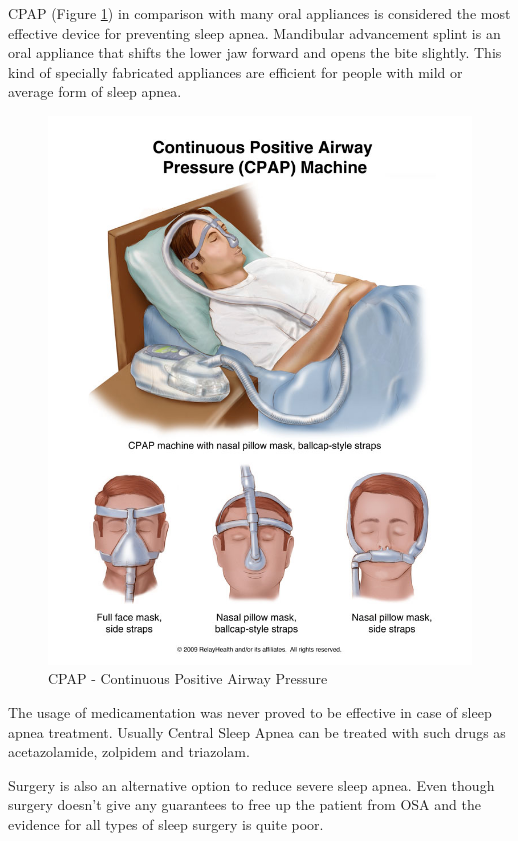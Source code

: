 \documentclass[12pt,a4paper]{report}
\begin{document}
CPAP (Figure \ref{fig:cpap}) in comparison with many oral appliances is considered the most effective device for preventing sleep apnea. Mandibular advancement splint is an oral appliance that shifts the lower jaw forward and opens the bite slightly. This kind of specially fabricated appliances are efficient for people with mild or average form of sleep apnea.

\begin{figure}[h]
\centering
  \includegraphics[max height=\textheight, max width=\textwidth, keepaspectratio]{06_cpap.jpg}
\caption{CPAP - Continuous Positive Airway Pressure}
\label{fig:cpap}
\end{figure}

The usage of medicamentation was never proved to be effective in case of sleep apnea treatment. Usually Central Sleep Apnea can be treated with such drugs as acetazolamide, zolpidem and triazolam.

Surgery is also an alternative option to reduce severe sleep apnea. Even though surgery doesn’t give any guarantees to free up the patient from OSA and the evidence for all types of sleep surgery is quite poor. 
\end{document}

